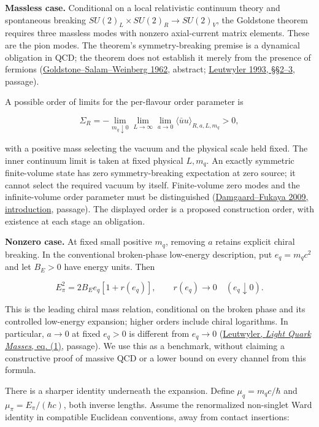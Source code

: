 \documentclass[11pt,a4paper]{article}
\begin{document}
\textbf{Massless case.} Conditional on a local relativistic continuum
theory and spontaneous breaking
\(SU(2)_L\mathbin{\times}SU(2)_R\to SU(2)_V\), the Goldstone theorem
requires three massless modes with nonzero axial-current matrix
elements. These are the pion modes. The theorem's symmetry-breaking
premise is a dynamical obligation in QCD; the theorem does not establish
it merely from the presence of fermions
(\href{https://doi.org/10.1103/PhysRev.127.965}{Goldstone--Salam--Weinberg
1962}, abstract; \href{https://arxiv.org/pdf/hep-ph/9311274}{Leutwyler
1993, §§2--3}, passage).

A possible order of limits for the per-flavour order parameter is

\[\Sigma_R=-\lim_{m_q\downarrow0}\lim_{L\to\infty}\lim_{a\to0}
\langle\bar u u\rangle_{R,a,L,m_q}>0,\]

with a positive mass selecting the vacuum and the physical scale held
fixed. The inner continuum limit is taken at fixed physical \(L,m_q\).
An exactly symmetric finite-volume state has zero symmetry-breaking
expectation at zero source; it cannot select the required vacuum by
itself. Finite-volume zero modes and the infinite-volume order parameter
must be distinguished
(\href{https://arxiv.org/pdf/0812.2797}{Damgaard--Fukaya 2009,
introduction}, passage). The displayed order is a proposed construction
order, with existence at each stage an obligation.

\textbf{Nonzero case.} At fixed small positive \(m_q\), removing \(a\)
retains explicit chiral breaking. In the conventional broken-phase
low-energy description, put \(e_q=m_qc^2\) and let \(B_E>0\) have energy
units. Then

\[E_\pi^2=2B_Ee_q[1+r(e_q)],\qquad r(e_q)\longrightarrow0
\quad(e_q\downarrow0).\]

This is the leading chiral mass relation, conditional on the broken
phase and its controlled low-energy expansion; higher orders include
chiral logarithms. In particular, \(a\to0\) at fixed \(e_q>0\) is
different from \(e_q\to0\)
(\href{https://arxiv.org/pdf/hep-ph/9609467}{Leutwyler, \emph{Light
Quark Masses}, eq. (1)}, passage). We use this as a benchmark, without
claiming a constructive proof of massive QCD or a lower bound on every
channel from this formula.

There is a sharper identity underneath the expansion. Define
\(\mu_q=m_qc/\hbar\) and \(\mu_\pi=E_\pi/(\hbar c)\), both inverse
lengths. Assume the renormalized non-singlet Ward identity in compatible
Euclidean conventions, away from contact insertions:
\end{document}
